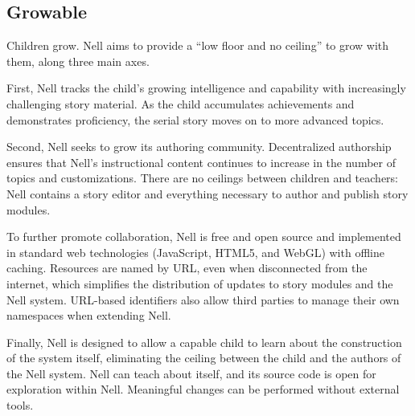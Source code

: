 \documentclass[preprint]{sig-alternate}
\begin{document}
\subsection{Growable}



Children grow.  Nell aims to provide a ``low floor and no ceiling'' to
grow with them, along three main axes.

First, Nell tracks the child's growing intelligence and capability
with increasingly challenging story material.  As the child
accumulates achievements and demonstrates
proficiency, the serial story moves on to more advanced topics.

Second, Nell seeks to grow its authoring community.  Decentralized
authorship ensures that Nell's instructional content
continues to increase in the number of topics and
customizations.  There are no
ceilings between children and teachers: Nell
contains a story editor and everything necessary to
author and publish story modules.

To further promote collaboration,
Nell is free and open source and implemented in standard web
technologies (JavaScript, HTML5, and WebGL) with offline caching.
Resources are named by URL, even when disconnected from the
internet, which simplifies the distribution of updates to story modules and
the Nell system.  URL-based identifiers also allow third parties
to manage their own namespaces when extending Nell.

Finally, Nell is designed to allow a capable child to learn about
the construction of the system itself,
eliminating the ceiling between the child and
the authors of the Nell system.  Nell can teach
about itself, and its source code is open for exploration within Nell.
Meaningful changes can be performed without external tools.
\end{document}
